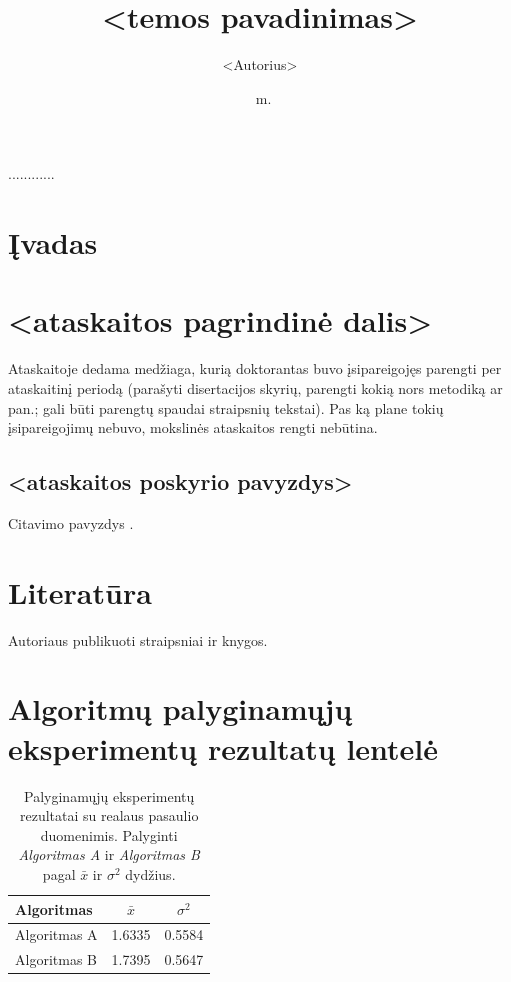 \documentclass[12pt, a4paper, lithuanian]{article}
\date{\the\year\ m.\monthlt[\month]}
\title{<temos pavadinimas>}
\author{<Autorius>}
\begin{document}
\maketitle

\noindent
............


\tableofcontents

\section{Įvadas}

\section{<ataskaitos pagrindinė dalis>}
Ataskaitoje dedama medžiaga, kurią doktorantas buvo įsipareigojęs parengti per
ataskaitinį periodą (parašyti disertacijos skyrių, parengti kokią nors metodiką
ar pan.; gali būti parengtų spaudai straipsnių tekstai). Pas ką plane tokių
įsipareigojimų nebuvo, mokslinės ataskaitos rengti nebūtina.

\subsection{<ataskaitos poskyrio pavyzdys>}
Citavimo pavyzdys \cite{VP}.

\section{Literatūra}
Autoriaus publikuoti straipsniai ir knygos.



\appendix
\section{Algoritmų palyginamųjų eksperimentų rezultatų lentelė}
\begin{table}[H]
  \centering
  \caption{Palyginamųjų eksperimentų rezultatai su realaus pasaulio duomenimis.
    Palyginti \emph{Algoritmas A} ir \emph{Algoritmas B} pagal $\bar{x}$ ir $\sigma^{2}$ dydžius.}
  {\begin{tabular}{|l|c|c|} \hline
    Algoritmas    & $\bar{x}$ & $\sigma^{2}$ \\
    \hline
    Algoritmas A  & 1.6335    & 0.5584       \\
    Algoritmas B  & 1.7395    & 0.5647       \\
    \hline
  \end{tabular}}
  \label{tab:table example}
\end{table}
\end{document}
